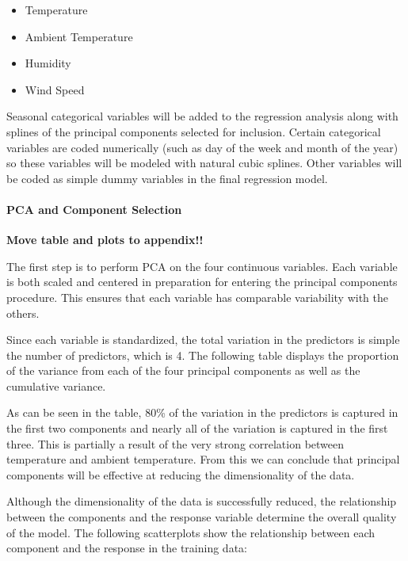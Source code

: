 \documentclass[
]{article}
\begin{document}
\begin{itemize}
\item
  Temperature
\item
  Ambient Temperature
\item
  Humidity
\item
  Wind Speed
\end{itemize}

Seasonal categorical variables will be added to the regression analysis
along with splines of the principal components selected for inclusion.
Certain categorical variables are coded numerically (such as day of the
week and month of the year) so these variables will be modeled with
natural cubic splines. Other variables will be coded as simple dummy
variables in the final regression model.

\hypertarget{pca-and-component-selection}{%
\paragraph{PCA and Component
Selection}\label{pca-and-component-selection}}

\textbf{Move table and plots to appendix!!}

The first step is to perform PCA on the four continuous variables. Each
variable is both scaled and centered in preparation for entering the
principal components procedure. This ensures that each variable has
comparable variability with the others.

Since each variable is standardized, the total variation in the
predictors is simple the number of predictors, which is 4. The following
table displays the proportion of the variance from each of the four
principal components as well as the cumulative variance.

As can be seen in the table, 80\% of the variation in the predictors is
captured in the first two components and nearly all of the variation is
captured in the first three. This is partially a result of the very
strong correlation between temperature and ambient temperature. From
this we can conclude that principal components will be effective at
reducing the dimensionality of the data.

Although the dimensionality of the data is successfully reduced, the
relationship between the components and the response variable determine
the overall quality of the model. The following scatterplots show the
relationship between each component and the response in the training
data:
\end{document}
